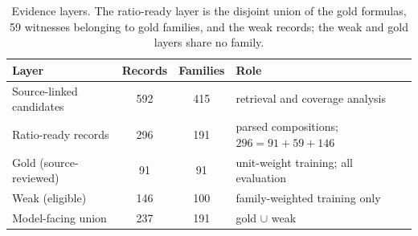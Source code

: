 \documentclass[10pt,a4paper]{article}
\begin{document}
\begin{table}[H]
\caption{Evidence layers. The ratio-ready layer is the disjoint union of the gold formulas, 59 witnesses belonging to gold families, and the weak records; the weak and gold layers share no family.}
\label{tab:layers}
\small
\begin{tabularx}{\textwidth}{lccL}
\toprule
\textbf{Layer} & \textbf{Records} & \textbf{Families} & \textbf{Role} \\
\midrule
Source-linked candidates & 592 & 415 & retrieval and coverage analysis \\
Ratio-ready records & 296 & 191 & parsed compositions; $296=91+59+146$ \\
Gold (source-reviewed) & 91 & 91 & unit-weight training; all evaluation \\
Weak (eligible) & 146 & 100 & family-weighted training only \\
Model-facing union & 237 & 191 & gold $\cup$ weak \\
\bottomrule
\end{tabularx}
\end{table}
\end{document}
